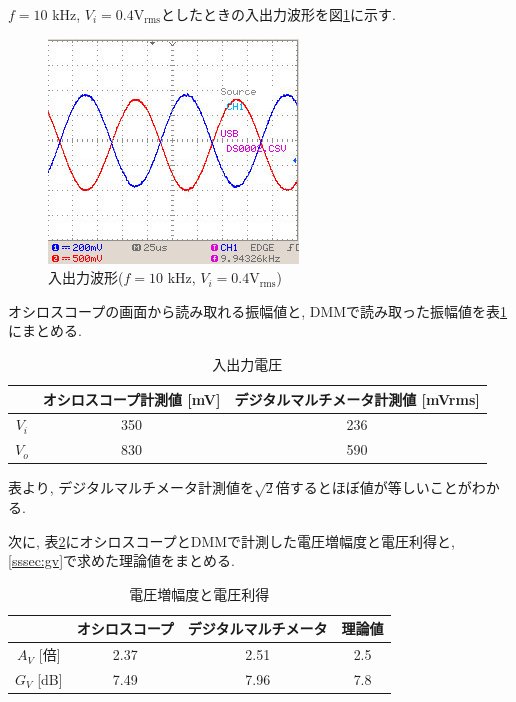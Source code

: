 \documentclass[titlepage]{jsarticle}
\begin{document}
                $f = 10$ kHz, $V_i = 0.4 \mathrm{V_{rms}}$としたときの入出力波形を図\ref{fig:oscillo}に示す.

                \begin{figure}[h]
                    \centering
                    \includegraphics[width=0.55\hsize]{images/AB_2-2-2_04V0p.jpg}
                    \caption{入出力波形($f = 10$ kHz, $V_i = 0.4 \mathrm{V_{rms}}$)}
                    \label{fig:oscillo}
                \end{figure}

                オシロスコープの画面から読み取れる振幅値と, DMMで読み取った振幅値を表\ref{tab:amp}にまとめる.

                \begin{table}[h]
                    \caption{入出力電圧}
                    \label{tab:amp}
                    \centering
                    \begin{tabular}{c||cc} \hline
                        & オシロスコープ計測値 [mV] & デジタルマルチメータ計測値 [mVrms] \\ \hline
                        $V_i$ & 350 & 236 \\
                        $V_o$ & 830 & 590 \\ \hline
                    \end{tabular}
                \end{table}

                表より, デジタルマルチメータ計測値を$\sqrt{2}$倍するとほぼ値が等しいことがわかる.

                次に, 表\ref{tab:av}にオシロスコープとDMMで計測した電圧増幅度と電圧利得と,
                \ref{sssec:gv}で求めた理論値をまとめる.

                \begin{table}[h]
                    \caption{電圧増幅度と電圧利得}
                    \label{tab:av}
                    \centering
                    \begin{tabular}{c||ccc} \hline
                        & オシロスコープ & デジタルマルチメータ & 理論値 \\ \hline
                        $A_V$ [倍] & 2.37 & 2.51 & 2.5 \\
                        $G_V$ [dB] & 7.49 & 7.96 & 7.8 \\ \hline
                    \end{tabular}
                \end{table}
\end{document}
